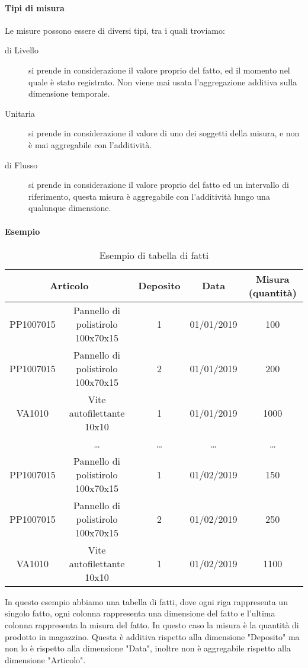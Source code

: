         \paragraph{Tipi di misura} Le misure possono essere di diversi tipi, tra i quali troviamo:
        \begin{description}
            \item[di Livello] si prende in considerazione il valore proprio del fatto, ed il momento nel quale è stato registrato. Non viene mai usata l'aggregazione additiva sulla dimensione temporale.
            \item[Unitaria] si prende in considerazione il valore di uno dei soggetti della misura, e non è mai aggregabile con l'additività.
            \item[di Flusso] si prende in considerazione il valore proprio del fatto ed un intervallo di riferimento, questa misura è aggregabile con l'additività lungo una qualunque dimensione.
        \end{description}
        \paragraph{Esempio}
        \begin{table}[H]
            \begin{tabular}{|c|c|c|c|c|}
                \hline
            \multicolumn{2}{|c|}{\textbf{Articolo}} & \textbf{Deposito} & \textbf{Data} & \textbf{Misura (quantità)} \\ \hline
            PP1007015 & Pannello di polistirolo 100x70x15 & 1 & 01/01/2019 & 100 \\ \hline
            PP1007015 & Pannello di polistirolo 100x70x15 & 2 & 01/01/2019 & 200 \\ \hline
            VA1010 & Vite autofilettante 10x10 & 1 & 01/01/2019 & 1000 \\ \hline
            &\dots&\dots&\dots&\dots\\ \hline
            PP1007015 & Pannello di polistirolo 100x70x15 & 1 & 01/02/2019 & 150 \\ \hline
            PP1007015 & Pannello di polistirolo 100x70x15 & 2 & 01/02/2019 & 250 \\ \hline
            VA1010 & Vite autofilettante 10x10 & 1 & 01/02/2019 & 1100 \\ \hline
            \end{tabular}
            \caption{Esempio di tabella di fatti}
        \end{table}
        In questo esempio abbiamo una tabella di fatti, dove ogni riga rappresenta un singolo fatto, ogni colonna rappresenta una dimensione del fatto e l'ultima colonna rappresenta la misura del fatto. In questo caso la misura è la quantità di prodotto in magazzino. Questa è additiva rispetto alla dimensione "Deposito" ma non lo è rispetto alla dimensione "Data", inoltre non è aggregabile rispetto alla dimensione "Articolo".